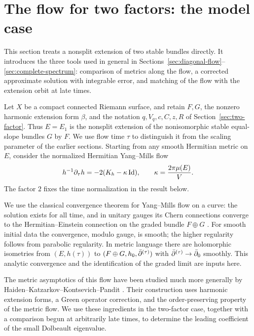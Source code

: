 \section{The flow for two factors: the model case}\label{sec:flow}

This section treats a nonsplit extension of two stable bundles directly.
It introduces the three tools used in general in
Sections~\ref{sec:diagonal-flow}--\ref{sec:complete-spectrum}: comparison
of metrics along the flow, a corrected approximate solution with integrable
error, and matching of the flow with the extension orbit at late times.

Let $X$ be a compact connected Riemann surface, and retain $F,G$, the
nonzero harmonic extension form $\beta$, and the notation $q,V_q,c,C,z,R$
of Section~\ref{sec:two-factor}. Thus $E=E_1$ is the nonsplit extension
of the nonisomorphic stable equal-slope bundles $G$ by $F$. We use flow
time $\tau$ to distinguish it from the scaling parameter of the earlier
sections. Starting from any smooth Hermitian metric on $E$, consider
the normalized Hermitian Yang--Mills flow
\begin{equation}\label{eq:metric-flow}
 h^{-1}\partial_\tau h=-2(K_h-\kappa\operatorname{Id}),\qquad
 \kappa=\frac{2\pi\mu(E)}{V}.
\end{equation}
The factor $2$ fixes the time normalization in the result below.

We use the classical convergence theorem for Yang--Mills flow on
a curve: the solution exists for all time, and in unitary gauges its
Chern connections converge to the Hermitian--Einstein connection on
the graded bundle $F\oplus G$
\cite{Daskalopoulos1992,Rade1992}. For smooth initial data the
convergence, modulo gauge, is smooth; the higher regularity follows
from parabolic regularity. In metric language there are holomorphic
isometries from $(E,h(\tau))$ to $(F\oplus G,h_0,\bar\partial^{(\tau)})$
with $\bar\partial^{(\tau)}\to\bar\partial_0$ smoothly. This analytic convergence
and the identification of the graded limit are inputs here.

The metric asymptotics of this flow have been studied much more
generally by Haiden--Katzarkov--Kontsevich--Pandit
\cite{HKKP2018}. Their construction uses harmonic extension forms,
a Green operator correction, and the order-preserving property of
the metric flow. We use these ingredients in the two-factor case,
together with a comparison begun at arbitrarily late times, to
determine the leading coefficient of the small Dolbeault eigenvalue.

